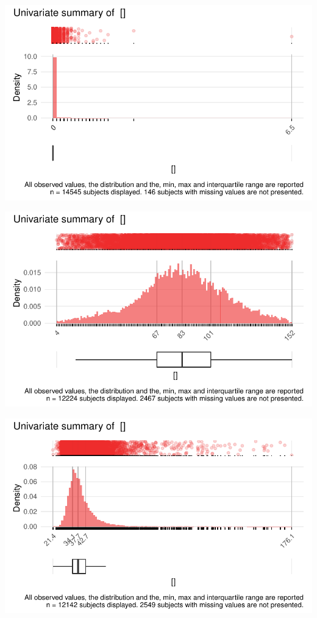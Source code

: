 \documentclass[
  letterpaper,
  DIV=11,
  numbers=noendperiod]{scrreport}
\begin{document}
\includegraphics{./Bact_univar_files/figure-pdf/uni04-11.pdf}

\includegraphics{./Bact_univar_files/figure-pdf/uni04-12.pdf}

\includegraphics{./Bact_univar_files/figure-pdf/uni04-13.pdf}
\end{document}
